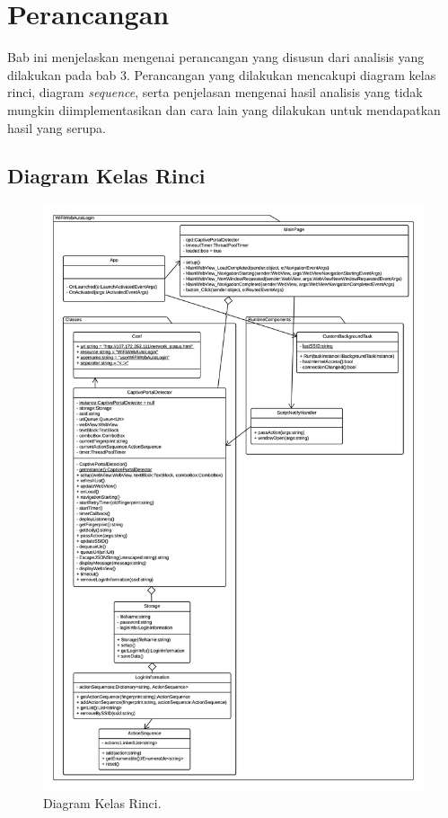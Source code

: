 \chapter{Perancangan}
\label{chap:perancangan}

Bab ini menjelaskan mengenai perancangan yang disusun dari analisis yang dilakukan pada bab 3. Perancangan yang dilakukan mencakupi diagram kelas rinci, diagram \textit{sequence}, serta penjelasan mengenai hasil analisis yang tidak mungkin diimplementasikan dan cara lain yang dilakukan untuk mendapatkan hasil yang serupa.



\section{Diagram Kelas Rinci}
\label{sec:diagram_kelas_rinci}

\begin{figure}[ht]
    \centering
    \includegraphics[scale=0.65]{Gambar/DetailedClassDiagram.png}
    \caption[Diagram Kelas Rinci.]{Diagram Kelas Rinci.} 
    \label{fig:DetailedClassDiagram}
\end{figure}

